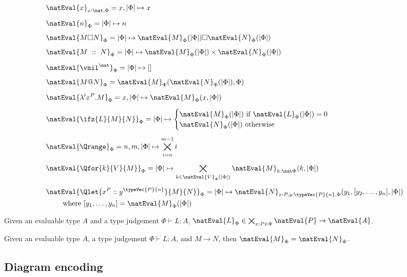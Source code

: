 \begin{align*}
    &\natEval{x}_{x:\nat, \Phi} = x, |\Phi| \mapsto x \\[5pt]
    &\natEval{n}_\Phi = |\Phi| \mapsto n\\[5pt]
    &\natEval{M \square N}_\Phi = |\Phi| \mapsto \natEval{M}_\Phi(|\Phi|) \square \natEval{N}_\Phi(|\Phi|)\\[5pt]
    &\natEval{M\ ::\ N}_{\Phi} = |\Phi| \mapsto \natEval{M}_\Phi(|\Phi|) \times \natEval{N}_\Phi(|\Phi|)\\[5pt]
    &\natEval{\vnil^\nat}_{\Phi} = |\Phi| \mapsto [] \\[5pt]
    &\natEval{M @ N}_\Phi = \natEval{M}_\Phi(\natEval{N}_\Phi(|\Phi|), \Phi) \\[5pt]
    &\natEval{\lambda' x^P.M}_\Phi = x,|\Phi| \mapsto \natEval{M}_\Phi(x,|\Phi|)\\[5pt]
    &\natEval{\ifz{L}{M}{N}}_\Phi = |\Phi| \mapsto 
    \begin{cases}
        \natEval{M}_\Phi(|\Phi|) \text{ if } \natEval{L}_\Phi(|\Phi|) = 0 \\
        \natEval{N}_\Phi(|\Phi|) \text{ otherwise}
    \end{cases}\\[5pt]
    &\natEval{\Qrange}_\Phi = n,m,|\Phi| \mapsto \bigtimes_{i=n}^{m-1} i\\[5pt]
    &\natEval{\Qfor{k}{V}{M}}_\Phi = |\Phi| \mapsto \bigtimes_{k\in \natEval{V}_\Phi(|\Phi|)} \natEval{M}_{k:\nat\Phi}(k, |\Phi|)\\[5pt]
    &\natEval{\Qlet{x^P :: y^{\typeVec{P}{n}}}{M}{N}}_\Phi = |\Phi|\mapsto \natEval{N}_{x:P, y:\typeVec{P}{n}, \Phi}(y_1,[y_2,\dots,y_n],|\Phi|)\\
    &\qquad{\text{ where } [y_1,\dots,y_n] = \natEval{M}_\Phi(|\Phi|)}
\end{align*}

\begin{lemma}%
    \label{lem:eval-type}
    Given an evaluable type $A$ and a type judgement $\Phi \vdash L : A$,
    $\natEval{L}_\Phi \in \bigtimes_{x:P \in \Phi} \natEval{P} \to \natEval{A}$.
\end{lemma}

\begin{lemma}%
    \label{lem:eval-reduction}
    Given an evaluable type $A$,
    a type judgement $\Phi \vdash L : A$, and $M \to N$, then $\natEval{M}_\Phi = \natEval{N}_\Phi$.
\end{lemma}

\subsection{Diagram encoding}

